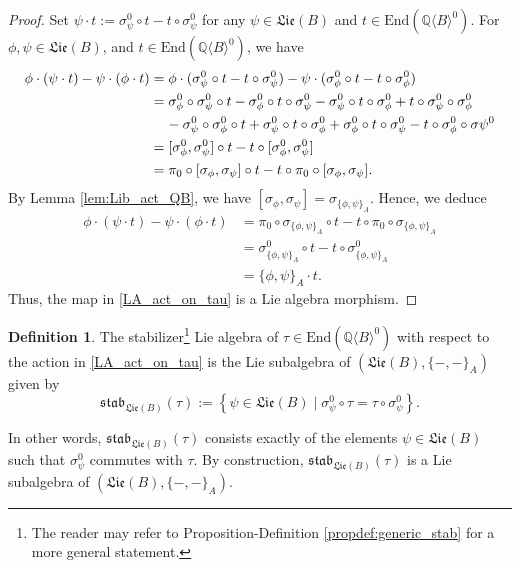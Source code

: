 \documentclass[11pt, a4paper]{amsart}
\numberwithin{equation}{section}
\theoremstyle{definition}
\newtheorem{definition}[theorem]{Definition}
\newcommand{\Q}{\mathbb{Q}}
\newcommand{\QB}{\Q\langle B\rangle}
\newcommand{\Lie}{\mathfrak{Lie}}
\newcommand{\stab}{\mathfrak{stab}}
\begin{document}
\begin{proof}
Set $\psi\cdot t:=\sigma_\psi^0\circ t - t\circ \sigma_\psi^0$ for any $\psi\in\Lie(B)$ and $t\in \mathrm{End}(\QB^0)$. \newline
For $\phi,\psi\in\Lie(B)$, and $t\in\mathrm{End}(\QB^0)$, we have
\begin{align*}
\phi\cdot (\psi\cdot t) - \psi\cdot(\phi\cdot t)&=\phi\cdot (\sigma_\psi^0\circ t - t\circ \sigma_\psi^0)-\psi\cdot(\sigma_\phi^0\circ t - t\circ \sigma_\phi^0) \\
&=\sigma_\phi^0\circ \sigma_\psi^0 \circ t - \sigma_\phi^0\circ t\circ \sigma_\psi^0 -\sigma_\psi^0\circ t \circ \sigma_\phi^0 + t\circ \sigma_\psi^0\circ \sigma_\phi^0 \\
&\hspace{0.4cm} - \sigma_\psi^0\circ \sigma_\phi^0\circ t +\sigma_\psi^0\circ t\circ \sigma_\phi^0 +\sigma_\phi^0\circ t \circ \sigma_\psi^0 - t\circ \sigma_\phi^0\circ \sigma\psi^0 \\
&=[\sigma_\phi^0,\sigma_\psi^0]\circ t - t\circ [\sigma_\phi^0,\sigma_\psi^0] \\
&=\pi_0\circ [\sigma_\phi,\sigma_\psi]\circ t - t\circ \pi_0\circ [\sigma_\phi,\sigma_\psi].
\end{align*}
By Lemma \ref{lem:Lib_act_QB}, we have $[\sigma_\phi,\sigma_\psi]=\sigma_{\{\phi,\psi\}_A}$. Hence, we deduce
\begin{align*}
\phi\cdot (\psi\cdot t) - \psi\cdot(\phi\cdot t)&=\pi_0\circ\sigma_{\{\phi,\psi\}_A}\circ t - t\circ \pi_0\circ \sigma_{\{\phi,\psi\}_A}\\
&=\sigma_{\{\phi,\psi\}_A}^0\circ t - t\circ \sigma_{\{\phi,\psi\}_A}^0 \\
&=\{\phi,\psi\}_A\cdot t. 
\end{align*}
Thus, the map in \eqref{LA_act_on_tau} is a Lie algebra morphism.
\end{proof}

\begin{definition} \label{def:stab_tau}
The stabilizer\footnote{The reader may refer to Proposition-Definition \ref{propdef:generic_stab} for a more general statement.} Lie algebra of $\tau \in \mathrm{End}(\QB^0)$ with respect to the action in \eqref{LA_act_on_tau} is the Lie subalgebra of $(\Lie(B), \{-,-\}_A)$ given by
\[
    \stab_{\Lie(B)}(\tau) := \left\{ \psi \in \Lie(B) \mid \sigma^0_\psi \circ \tau = \tau \circ \sigma^0_\psi \right\}.
\]
\end{definition}
In other words, $\stab_{\Lie(B)}(\tau)$ consists exactly of the elements $\psi\in \Lie(B)$ such that $\sigma_\psi^0$ commutes with $\tau$.
By construction, $\stab_{\Lie(B)}(\tau)$ is a Lie subalgebra of $(\Lie(B), \{-,-\}_A)$.
\end{document}
